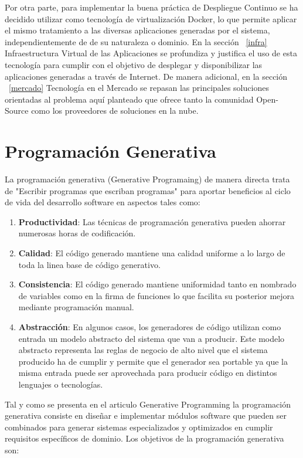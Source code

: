 \documentclass[a4paper,11pt]{book}
\begin{document}
Por otra parte, para implementar la buena práctica de Despliegue Continuo se ha decidido utilizar como tecnología de virtualización  Docker, lo que permite aplicar el mismo tratamiento a las diversas aplicaciones generadas por el sistema, independientemente de de su naturaleza o dominio. En la sección ~\ref{infra} 
Infraestructura Virtual de las Aplicaciones se profundiza y justifica el uso de esta tecnología para cumplir con el objetivo de desplegar y disponibilizar las aplicaciones generadas a través de Internet. De manera adicional, en la sección ~\ref{mercado} Tecnología en el Mercado se repasan las principales soluciones orientadas al problema aquí planteado que ofrece tanto la comunidad Open-Source como los proveedores de soluciones en la nube.   

\section{Programación Generativa}

La programación generativa (Generative Programaing) de manera directa trata de "Escribir programas que escriban programas"  para aportar beneficios al ciclo de vida del desarrollo software en aspectos tales como: 

\begin{enumerate}
\item \textbf{Productividad}:  Las técnicas de programación generativa pueden ahorrar numerosas horas de codificación.  
\item \textbf{Calidad}: El código generado mantiene una calidad uniforme a lo largo de toda la linea base de código generativo.
\item \textbf{Consistencia}: El código generado mantiene uniformidad tanto en nombrado de variables como en la firma de funciones lo que facilita su posterior mejora mediante programación manual. 
\item \textbf{Abstracción}: En algunos casos, los generadores de código utilizan como entrada un modelo abstracto del sistema que van a producir. Este modelo abstracto representa las reglas de negocio de alto nivel que el sistema producido ha de cumplir y permite que el generador sea portable ya que la misma entrada puede ser aprovechada para producir código en distintos lenguajes o tecnologías. 
\end{enumerate}

Tal y como se presenta en el articulo Generative Programming\cite{gp} la programación generativa consiste en diseñar e implementar módulos software que pueden ser combinados para generar sistemas especializados y  optimizados en cumplir requisitos específicos de dominio. Los objetivos de la programación generativa son:
\end{document}

